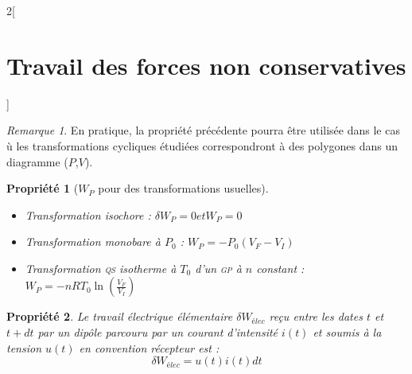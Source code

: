\documentclass[french]{book}
\newtheorem*{propriete}{Propriété}
\theoremstyle{definition}
\theoremstyle{remark}
\newtheorem*{remarque}{Remarque}
\newcommand*{\abr}[1]{\textsc{#1}}
\begin{document}
\begin{landscape}
\begin{multicols*}{2}[\section{Travail des forces non conservatives}]
\begin{remarque}

En pratique, la propriété précédente pourra être utilisée dans le cas ù les transformations cycliques étudiées correspondront à des polygones dans un diagramme ($P$,$V$).

\end{remarque}

\begin{propriete}[$W_P$ pour des transformations usuelles]

\begin{itemize}
\item Transformation isochore : $\delta W_P = 0 et W_P = 0$
\item Transformation monobare à $P_0$ : $W_P = -P_0(V_F - V_I)$
\item Transformation \abr{qs} isotherme à $T_0$ d'un \abr{gp} à $n$ constant : $W_P = -nRT_0\ln \left( \frac{V_F}{V_I} \right) $
\end{itemize}

\end{propriete}

\begin{propriete}

Le travail électrique élémentaire $\delta W_{élec}$ reçu entre les dates $t$ et $t + dt$ par un dipôle parcouru par un courant d'intensité $i(t)$ et soumis à la tension $u(t)$ en convention récepteur est :
\[
\delta W_{élec} = u(t)i(t)dt
\]

\end{propriete}

\end{multicols*}
\end{landscape}
\end{document}
